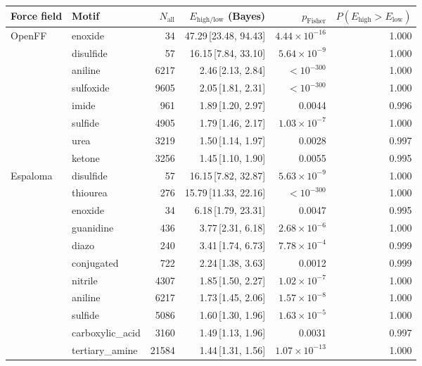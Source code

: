 \begin{table}[t]
  \centering
  \small
  \setlength{\tabcolsep}{6pt}
  \renewcommand{\arraystretch}{1.15}
  \begin{tabular}{llrrrr}
    \hline
    Force field & Motif & $N_\mathrm{all}$ & $E_{\mathrm{high/low}}$ (Bayes) & $p_\mathrm{Fisher}$ & $P(E_{\mathrm{high}}>E_{\mathrm{low}})$ \\
    \hline
    OpenFF & enoxide & 34 & 47.29\,[23.48, 94.43] & $4.44\times 10^{-16}$ & 1.000 \\
      & disulfide & 57 & 16.15\,[7.84, 33.10] & $5.64\times 10^{-9}$ & 1.000 \\
      & aniline & 6217 & 2.46\,[2.13, 2.84] & $< 10^{-300}$ & 1.000 \\
      & sulfoxide & 9605 & 2.05\,[1.81, 2.31] & $< 10^{-300}$ & 1.000 \\
      & imide & 961 & 1.89\,[1.20, 2.97] & 0.0044 & 0.996 \\
      & sulfide & 4905 & 1.79\,[1.46, 2.17] & $1.03\times 10^{-7}$ & 1.000 \\
      & urea & 3219 & 1.50\,[1.14, 1.97] & 0.0028 & 0.997 \\
      & ketone & 3256 & 1.45\,[1.10, 1.90] & 0.0055 & 0.995 \\
    \hline
    Espaloma & disulfide & 57 & 16.15\,[7.82, 32.87] & $5.63\times 10^{-9}$ & 1.000 \\
      & thiourea & 276 & 15.79\,[11.33, 22.16] & $< 10^{-300}$ & 1.000 \\
      & enoxide & 34 & 6.18\,[1.79, 23.31] & 0.0047 & 0.995 \\
      & guanidine & 436 & 3.77\,[2.31, 6.18] & $2.68\times 10^{-6}$ & 1.000 \\
      & diazo & 240 & 3.41\,[1.74, 6.73] & $7.78\times 10^{-4}$ & 0.999 \\
      & conjugated & 722 & 2.24\,[1.38, 3.63] & 0.0012 & 0.999 \\
      & nitrile & 4307 & 1.85\,[1.50, 2.27] & $1.02\times 10^{-7}$ & 1.000 \\
      & aniline & 6217 & 1.73\,[1.45, 2.06] & $1.57\times 10^{-8}$ & 1.000 \\
      & sulfide & 5086 & 1.60\,[1.30, 1.96] & $1.63\times 10^{-5}$ & 1.000 \\
      & carboxylic\_acid & 3160 & 1.49\,[1.13, 1.96] & 0.0031 & 0.997 \\
      & tertiary\_amine & 21584 & 1.44\,[1.31, 1.56] & $1.07\times 10^{-13}$ & 1.000 \\

\end{tabular}
\end{table}
